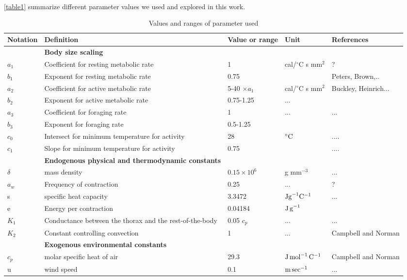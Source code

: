 \cref{table1} summarize different parameter values we used and explored in this work.

\begin{sidewaystable}
\caption{Values and ranges of parameter used }
\begin{tabular}{l l l l l}
\hline
Notation& Definition & Value or range & Unit & References \\ 
\hline
&\textbf{ Body size scaling} & & &  \\ 
$a_1$ & Coefficient for resting metabolic rate  & 1 &  cal/$^{\circ}$C s mm$^2$ &  ?\citet{Heinrich1975} \\
$b_1$ & Exponent for resting metabolic rate  & 0.75 &  &  Peters, Brown,.. \\
$a_2$ & Coefficient for active metabolic rate  & 5-40 $ \times a_1$ &  cal/$^{\circ}$C s mm$^2$ &  Buckley, Heinrich... \\
$b_2$ & Exponent for active metabolic rate  & 0.75-1.25 & ... &  \citet{Heinrich1975} \\
$a_3$ & Coefficient for foraging rate  & 1 & ...  &  ... \\
$b_3$ & Exponent  for foraging rate  & 0.5-1.25 &  &  \citet{Nervo2014} \\
$c_0$ & Intersect for minimum temperature for activity & 28 & $^{\circ}\rm{C}$  & ....\\
$c_1$ & Slope for minimum temperature for activity & 0.75 &  & ....\\
\hline
& \textbf{Endogenous physical and thermodynamic constants} & & &  \\
$\delta $ & mass density & $0.15 \times 10^6$  & g  mm$^{-3}$  & ... \\
$a_w$& Frequency of contraction & 0.25 & ...& ?\citet{Bartholomew1977b}\\
s & specific heat capacity & 3.3472 & $\rm{J g}^{-1} \rm{C}^{-1}$ & ... \\
e & Energy per contraction & 0.04184 & $\rm{J \, g}^{-1}$ &\citet{Kammer1974} \\
$K_1$& Conductance between the thorax and the rest-of-the-body & 0.05 $c_p$ & ... & ... \\
$K_2$& Constant controlling convection & 1   & ... & Campbell and Norman \\
\hline
& \textbf{Exogenous environmental constants} & & &  \\
$c_p$ & molar specific heat of air  & 29.3 &  $\rm{J \, mol}^ {-1} \, \rm{C}^ {-1}$ & Campbell and Norman \\
u &  wind speed & 0.1 & $\rm{m \, sec}^{-1}$ & ...\\

\end{tabular}
\end{sidewaystable}
